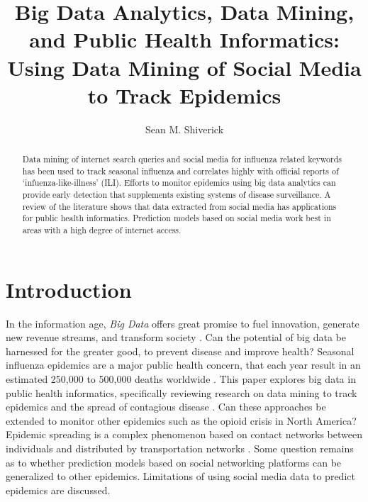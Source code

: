 \documentclass[sigconf]{acmart}
\begin{document}
\title{Big Data Analytics, Data Mining, and Public Health Informatics: 
Using Data Mining of Social Media to Track Epidemics}
\author{Sean M. Shiverick}

\begin{abstract}

Data mining of internet search queries and social media for influenza related keywords 
has been used to track seasonal influenza and correlates highly with official reports 
of `infuenza-like-illness' (ILI). Efforts to monitor epidemics using big data analytics 
can provide early detection that supplements existing systems of disease surveillance. 
A review of the literature shows that data extracted from social media has applications 
for public health informatics. Prediction models based on social media work best in 
areas with a high degree of internet access.  

\end{abstract}


\maketitle

\section{Introduction}

In the information age, \textit{Big Data} offers great promise to fuel innovation, 
generate new revenue streams, and transform society \cite{gupta15}. Can the 
potential of big data be harnessed for the greater good, to prevent disease 
and improve health? Seasonal influenza epidemics are a major public health concern, 
that each year result in an estimated 250,000 to 500,000 deaths worldwide 
\cite{who16}. This paper explores big data in public health informatics, 
specifically reviewing research on data mining to track epidemics and the spread 
of contagious disease \cite{hay13}. Can these approaches be extended to monitor 
other epidemics such as the opioid crisis in North America? \cite{volkow14}
Epidemic spreading is a complex phenomenon based on contact networks between 
individuals and distributed by transportation networks \cite{Colizza06}. Some 
question remains as to whether prediction models based on social networking 
platforms can be generalized to other epidemics. Limitations of using social 
media data to predict epidemics are discussed.
\end{document}
